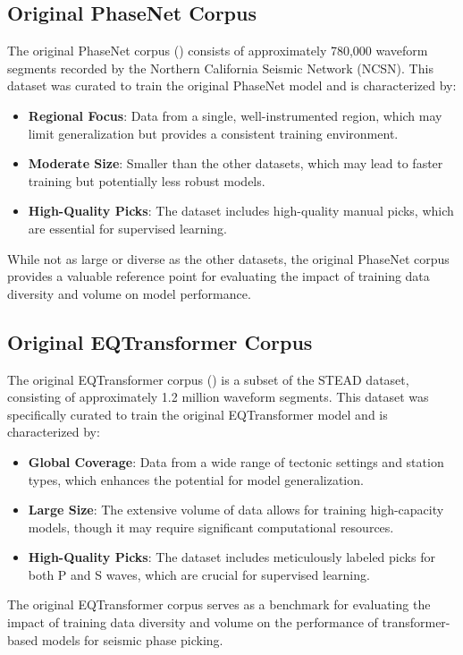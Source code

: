 \subsection{Original PhaseNet Corpus}
\label{sec:Original}
The original PhaseNet corpus (\cite{PhaseNet}) consists of approximately
780,000 waveform segments recorded by the Northern California Seismic Network
(NCSN). This dataset was curated to train the original PhaseNet model and is
characterized by:
\begin{itemize}
  \item \textbf{Regional Focus}: Data from a single, well-instrumented
    region, which may limit generalization but provides a consistent training
    environment.
  \item \textbf{Moderate Size}: Smaller than the other datasets, which may
    lead to faster training but potentially less robust models.
  \item \textbf{High-Quality Picks}: The dataset includes high-quality manual
    picks, which are essential for supervised learning.
\end{itemize}
While not as large or diverse as the other datasets, the original PhaseNet
corpus provides a valuable reference point for evaluating the impact of
training data diversity and volume on model performance.

\subsection{Original EQTransformer Corpus}
\label{sec:Original_EQT}
The original EQTransformer corpus (\cite{EQTransformer}) is a subset of the
STEAD dataset, consisting of approximately 1.2 million waveform segments. This
dataset was specifically curated to train the original EQTransformer model and
is characterized by:
\begin{itemize}
  \item \textbf{Global Coverage}: Data from a wide range of tectonic settings
    and station types, which enhances the potential for model generalization.
  \item \textbf{Large Size}: The extensive volume of data allows for training
    high-capacity models, though it may require significant computational
    resources.
  \item \textbf{High-Quality Picks}: The dataset includes meticulously labeled
    picks for both P and S waves, which are crucial for supervised learning.
\end{itemize}
The original EQTransformer corpus serves as a benchmark for evaluating the
impact of training data diversity and volume on the performance of
transformer-based models for seismic phase picking.


